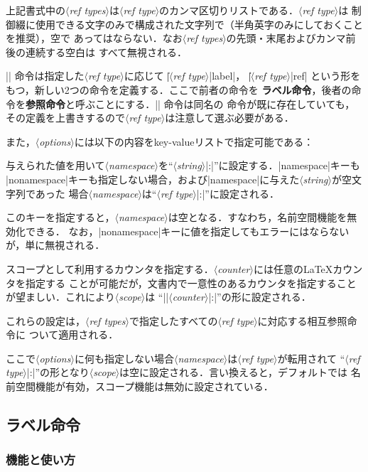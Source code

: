 \documentclass[a4paper,uplatex]{jsarticle}
\newcommand{\Meta}[1]{$\langle$\mbox{}\textit{#1}\mbox{}$\rangle$}
\begin{document}
上記書式中の\Meta{ref types}は\Meta{ref type}のカンマ区切りリストである．\Meta{ref type}は
制御綴に使用できる文字のみで構成された文字列で（半角英字のみにしておくことを推奨），空で
あってはならない．なお\Meta{ref types}の先頭・末尾およびカンマ前後の連続する空白は
すべて無視される．

|\newref| 命令は指定した\Meta{ref type}に応じて |\|\Meta{ref type}|label|，
|\|\Meta{ref type}|ref| という形をもつ，新しい2つの命令を定義する．ここで前者の命令を
\textbf{ラベル命令}，後者の命令を\textbf{参照命令}と呼ぶことにする．|\newref| 命令は同名の
命令が既に存在していても，その定義を上書きするので\Meta{ref type}は注意して選ぶ必要がある．

また，\Meta{options}には以下の内容をkey-valueリストで指定可能である：
%
\begin{description}[font=\normalfont]
%
\item[|namespace=|\Meta{string}]
与えられた値を用いて\Meta{namespace}を``\Meta{string}|:|''に設定する．|namespace|キーも
|nonamespace|キーも指定しない場合，および|namespace|に与えた\Meta{string}が空文字列であった
場合\Meta{namespace}は``\Meta{ref type}|:|''に設定される．
%
\item[|nonamespace|]
このキーを指定すると，\Meta{namespace}は空となる．すなわち，名前空間機能を無効化できる．
なお，|nonamespace|キーに値を指定してもエラーにはならないが，単に無視される．
%
\item[|scope=|\Meta{counter}]
スコープとして利用するカウンタを指定する．\Meta{counter}には任意の\LaTeX カウンタを指定する
ことが可能だが，文書内で一意性のあるカウンタを指定することが望ましい．これにより\Meta{scope}は
``|\the|\Meta{counter}|:|''の形に設定される．
\end{description}
%
これらの設定は，\Meta{ref types}で指定したすべての\Meta{ref type}に対応する相互参照命令に
ついて適用される．

ここで\Meta{options}に何も指定しない場合\Meta{namespace}は\Meta{ref type}が転用されて
``\Meta{ref type}|:|''の形となり\Meta{scope}は空に設定される．言い換えると，デフォルトでは
名前空間機能が有効，スコープ機能は無効に設定されている．

\subsection{ラベル命令}

\subsubsection{機能と使い方}
\end{document}
